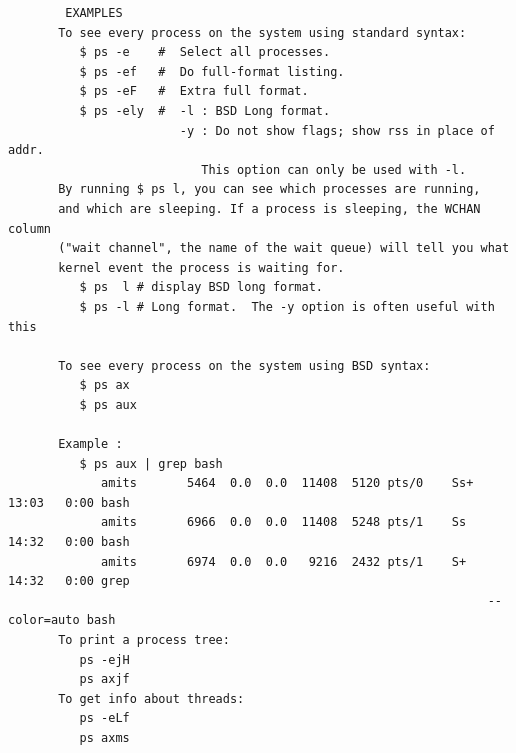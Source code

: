 \documentclass[a4paper,12pt]{article}
\begin{document}
\begin{verbatim}
        EXAMPLES
       To see every process on the system using standard syntax:
          $ ps -e    #  Select all processes.
          $ ps -ef   #  Do full-format listing.
          $ ps -eF   #  Extra full format.
          $ ps -ely  #  -l : BSD Long format.
                        -y : Do not show flags; show rss in place of addr.
                           This option can only be used with -l.
       By running $ ps l, you can see which processes are running, 
       and which are sleeping. If a process is sleeping, the WCHAN column  
       ("wait channel", the name of the wait queue) will tell you what
       kernel event the process is waiting for. 
          $ ps  l # display BSD long format.
          $ ps -l # Long format.  The -y option is often useful with this   
   
       To see every process on the system using BSD syntax:
          $ ps ax
          $ ps aux

       Example : 
          $ ps aux | grep bash
             amits       5464  0.0  0.0  11408  5120 pts/0    Ss+  13:03   0:00 bash
             amits       6966  0.0  0.0  11408  5248 pts/1    Ss   14:32   0:00 bash
             amits       6974  0.0  0.0   9216  2432 pts/1    S+   14:32   0:00 grep 
                                                                   --color=auto bash
       To print a process tree:
          ps -ejH
          ps axjf
       To get info about threads:
          ps -eLf
          ps axms   


\end{verbatim}
\end{document}
